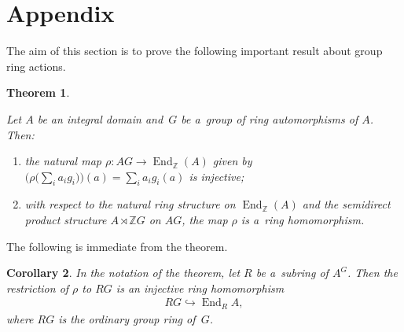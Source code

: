 \documentclass[11pt]{article}
\DeclareMathOperator{\End}{End}
\newtheorem{Theorem}{Theorem}[section]
\newtheorem{Corollary}[Theorem]{Corollary}
\begin{document}
\section{Appendix}

The aim of this section is to prove the following important result about group ring actions.

\begin{Theorem}
\label{thm:Premet}

Let $A$ be an integral domain and~$G$ be a~group of ring automorphisms of $A$.
Then:
\begin{enumerate}\itemsep=0pt
\item[$(a)$] the natural map $\rho\colon AG \to \End_\mathbb Z(A)$ given by $\big(\rho\big(\sum\limits_i a_i g_i\big)\big)(a)=\sum\limits_i a_i g_i(a)$ is injective;
\item[$(b)$] with respect to the natural ring structure on $\End_\mathbb Z(A)$ and the semidirect product structure $A\rtimes
\mathbb Z G$ on $AG$, the map $\rho$ is a~ring homomorphism.
\end{enumerate}
\end{Theorem}

The following is immediate from the theorem.

\begin{Corollary}
\label{cor:premet-dedekind}
In the notation of the theorem, let $R$ be a~subring of $A^G$.
Then the restriction of $\rho$ to $RG$ is an injective ring homomorphism
\begin{gather*}
RG\hookrightarrow \End_R A,
\end{gather*}
where $RG$ is the ordinary group ring of~$G$.
\end{Corollary}
\end{document}
